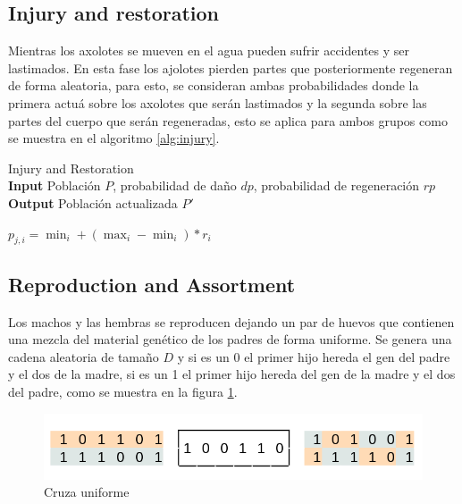  \subsection{Injury and restoration}
 
 Mientras los axolotes se mueven en el agua pueden sufrir accidentes y ser lastimados. En esta fase los ajolotes pierden partes que posteriormente regeneran de forma aleatoria, para esto, se consideran ambas probabilidades donde la primera actuá sobre los axolotes que serán lastimados y la segunda sobre las partes del cuerpo que serán regeneradas, esto se aplica para ambos grupos como se muestra en el algoritmo \ref{alg:injury}.
 
  \begin{algorithm}
 	\caption{Injury and Restoration \\
 		\textbf{Input} Población $P$, probabilidad de daño $dp$, probabilidad de regeneración $rp$ \\
 		\textbf{Output}  Población actualizada $P'$} 
 	\begin{algorithmic}[1]
 						\State $p_{j,i} = \min_i + (\max_i - \min_i) * r_i$
 					\EndIf
 				\EndFor
 			\EndIf
 		\EndFor
 	\end{algorithmic}
 	\label{alg:injury}
 \end{algorithm}
 
 \subsection{Reproduction and Assortment}
 
 Los machos y las hembras se reproducen dejando un par de huevos que contienen una mezcla del material genético de los padres de forma uniforme. Se genera una cadena aleatoria de tamaño $D$ y si es un 0 el primer hijo hereda el gen del padre y el dos de la madre, si es un 1 el primer hijo hereda del gen de la madre y el dos del padre, como se muestra en la figura \ref{fig:uniform}.

 \begin{figure}[H]
 	\centering
 	\includegraphics[width=0.75\linewidth]{img/cross_uniform.png}
 	\caption{Cruza uniforme}
 	\label{fig:uniform}
 \end{figure}
 
